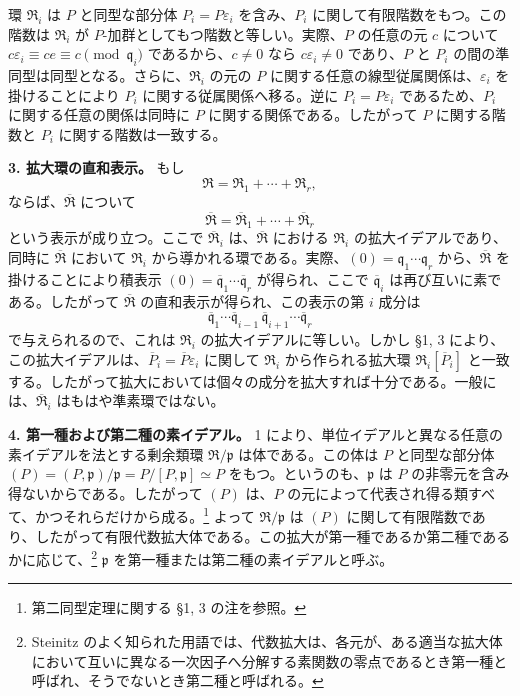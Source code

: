 \documentclass[11pt]{article}
\begin{document}
環 $\mathfrak R_i$ は $P$ と同型な部分体 $P_i=P\varepsilon_i$ を含み、$P_i$ に関して有限階数をもつ。この階数は $\mathfrak R_i$ が $P$-加群としてもつ階数と等しい。実際、$P$ の任意の元 $c$ について $c\varepsilon_i\equiv ce\equiv c\pmod{\mathfrak q_i}$ であるから、$c\ne0$ なら $c\varepsilon_i\ne0$ であり、$P$ と $P_i$ の間の準同型は同型となる。さらに、$\mathfrak R_i$ の元の $P$ に関する任意の線型従属関係は、$\varepsilon_i$ を掛けることにより $P_i$ に関する従属関係へ移る。逆に $P_i=P\varepsilon_i$ であるため、$P_i$ に関する任意の関係は同時に $P$ に関する関係である。したがって $P$ に関する階数と $P_i$ に関する階数は一致する。

\textbf{3. 拡大環の直和表示。} もし
\[
   \mathfrak R=\mathfrak R_1+\cdots+\mathfrak R_r,
\]
ならば、$\overline{\mathfrak R}$ について
\[
   \overline{\mathfrak R}=\overline{\mathfrak R}_1+\cdots+\overline{\mathfrak R}_r
\]
という表示が成り立つ。ここで $\overline{\mathfrak R}_i$ は、$\overline{\mathfrak R}$ における $\mathfrak R_i$ の拡大イデアルであり、同時に $\overline{\mathfrak R}$ において $\mathfrak R_i$ から導かれる環である。実際、$(0)=\mathfrak q_1\cdots\mathfrak q_r$ から、$\overline{\mathfrak R}$ を掛けることにより積表示 $(0)=\overline{\mathfrak q}_1\cdots\overline{\mathfrak q}_r$ が得られ、ここで $\overline{\mathfrak q}_i$ は再び互いに素である。したがって $\overline{\mathfrak R}$ の直和表示が得られ、この表示の第 $i$ 成分は
\[
   \overline{\mathfrak q}_1\cdots \overline{\mathfrak q}_{i-1}\,
   \overline{\mathfrak q}_{i+1}\cdots \overline{\mathfrak q}_r
\]
で与えられるので、これは $\mathfrak R_i$ の拡大イデアルに等しい。しかし \S 1, 3 により、この拡大イデアルは、$\overline P_i=\overline P\varepsilon_i$ に関して $\mathfrak R_i$ から作られる拡大環 $\mathfrak R_i[\overline P_i]$ と一致する。したがって拡大においては個々の成分を拡大すれば十分である。一般には、$\overline{\mathfrak R}_i$ はもはや準素環ではない。

\textbf{4. 第一種および第二種の素イデアル。} 1 により、単位イデアルと異なる任意の素イデアルを法とする剰余類環 $\mathfrak R/\mathfrak p$ は体である。この体は $P$ と同型な部分体 $(P)=(P,\mathfrak p)/\mathfrak p=P/[P,\mathfrak p]\simeq P$ をもつ。というのも、$\mathfrak p$ は $P$ の非零元を含み得ないからである。したがって $(P)$ は、$P$ の元によって代表され得る類すべて、かつそれらだけから成る。\footnote{第二同型定理に関する \S 1, 3 の注を参照。} よって $\mathfrak R/\mathfrak p$ は $(P)$ に関して有限階数であり、したがって有限代数拡大体である。この拡大が第一種であるか第二種であるかに応じて、\footnote{Steinitz のよく知られた用語では、代数拡大は、各元が、ある適当な拡大体において互いに異なる一次因子へ分解する素関数の零点であるとき第一種と呼ばれ、そうでないとき第二種と呼ばれる。} $\mathfrak p$ を第一種または第二種の素イデアルと呼ぶ。
\end{document}
